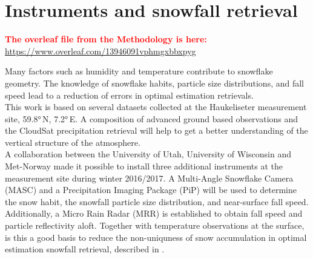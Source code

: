 \chapter{Instruments and snowfall retrieval} \label{ch:DIM}
\textcolor{red}{\textbf{The overleaf file from the Methodology is here:} \\ \url{https://www.overleaf.com/13946091vphmgxbbxpyg}}

Many factors such as humidity and temperature contribute to snowflake geometry. The knowledge of snowflake habits, particle size distributions, and fall speed lead to a reduction of errors in optimal estimation retrievals. \\
This work is based on several datasets collected at the Haukeliseter measurement site, \ang{59.8}\,N, \ang{7.2}\,E. A composition of advanced ground based observations and the CloudSat precipitation retrieval will help to get a better understanding of the vertical structure of the atmosphere. 
\\
A collaboration between the University of Utah, University of Wisconsin and Met-Norway made it possible to install three additional instruments at the measurement site during winter 2016/2017. A Multi-Angle Snowflake Camera (MASC) and a Precipitation Imaging Package (PiP) will be used to determine the snow habit, the snowfall particle size distribution, and near-surface fall speed. Additionally, a Micro Rain Radar (MRR) is established to obtain fall speed and particle reflectivity aloft. Together with temperature observations at the surface, is this a good basis to reduce the non-uniquness of snow accumulation in optimal estimation snowfall retrieval, described in . 
%
%
\pagebreak
